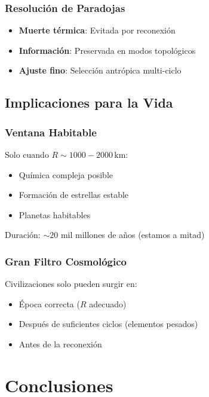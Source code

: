 \documentclass[12pt,a4paper]{article}
\begin{document}
\subsubsection{Resolución de Paradojas}

\begin{itemize}
    \item \textbf{Muerte térmica}: Evitada por reconexión
    \item \textbf{Información}: Preservada en modos topológicos
    \item \textbf{Ajuste fino}: Selección antrópica multi-ciclo
\end{itemize}

\subsection{Implicaciones para la Vida}

\subsubsection{Ventana Habitable}

Solo cuando $R \sim 1000-2000\,\mathrm{km}$:
\begin{itemize}
    \item Química compleja posible
    \item Formación de estrellas estable
    \item Planetas habitables
\end{itemize}

Duración: $\sim 20$ mil millones de años (estamos a mitad)

\subsubsection{Gran Filtro Cosmológico}

Civilizaciones solo pueden surgir en:
\begin{itemize}
    \item Época correcta ($R$ adecuado)
    \item Después de suficientes ciclos (elementos pesados)
    \item Antes de la reconexión
\end{itemize}

\section{Conclusiones}
\label{sec:conclusiones}
\end{document}

